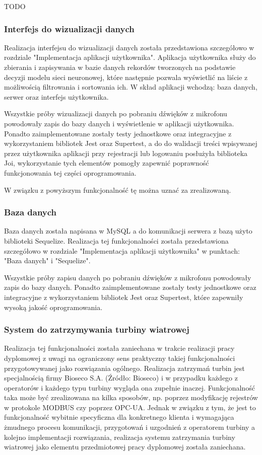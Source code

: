 \documentclass{sprz}
\begin{document}
TODO

\subsubsection{Interfejs do wizualizacji danych}
Realizacja interfejsu do wizualizacji danych została przedstawiona szczegółowo w rozdziale "Implementacja aplikacji użytkownika". Aplikacja użytkownika służy do zbierania i zapisywania w bazie danych rekordów tworzonych na podstawie decyzji modelu sieci neuronowej, które następnie pozwala wyświetlić na liście z możliwością filtrowania i sortowania ich. W skład aplikacji wchodzą: baza danych, serwer oraz interfejs użytkownika. 


Wszystkie próby wizualizacji danych po pobraniu dźwięków z mikrofonu powodowały zapis do bazy danych i wyświetlenie w aplikacji użytkownika. Ponadto zaimplementowane zostały testy jednostkowe oraz integracyjne z wykorzystaniem bibliotek Jest oraz Supertest, a do do walidacji treści wpisywanej przez użytkownika aplikacji przy rejestracji lub logowaniu posłużyła biblioteka Joi, wykorzystanie tych elementów pomogły zapewnić poprawność funkcjonowania tej części oprogramowania.

W związku z powyższym funkcjonalność tę można uznać za zrealizowaną.

\subsubsection{Baza danych}
Baza danych została napisana w MySQL a do komunikacji serwera z bazą użyto biblioteki Sequelize. Realizacja tej funkcjonalności została przedstawiona szczegółowo w rozdziale "Implementacja aplikacji użytkownika" w punktach: "Baza danych" i "Sequelize". 

Wszystkie próby zapisu danych po pobraniu dźwięków z mikrofonu powodowały zapis do bazy danych. Ponadto zaimplementowane zostały testy jednostkowe oraz integracyjne z wykorzystaniem bibliotek Jest oraz Supertest, które zapewniły wysoką jakość oprogramowania.

\subsubsection{System do zatrzymywania turbiny wiatrowej}
Realizacja tej funkcjonalności została zaniechana w trakcie realizacji pracy dyplomowej z uwagi na ograniczony sens praktyczny takiej funkcjonalności przygotowywanej jako rozwiązania ogólnego. Realizacja zatrzymań turbin jest specjalnością firmy Bioseco S.A. (Źródło: Bioseco) i w przypadku każdego z operatorów i każdego typu turbiny wygląda ona zupełnie inaczej. Funkcjonalność taka może być zrealizowana na kilka sposobów, np. poprzez modyfikację rejestrów w protokole MODBUS czy poprzez OPC-UA. Jednak w związku z tym, że jest to funkcjonalność wybitnie specyficzna dla konkretnego klienta i wymagająca żmudnego procesu komunikacji, przygotowań i uzgodnień z operatorem turbiny a kolejno implementacji rozwiązania, realizacja systemu zatrzymania turbiny wiatrowej jako elementu przedmiotowej pracy dyplomowej została zaniechana.
\end{document}

